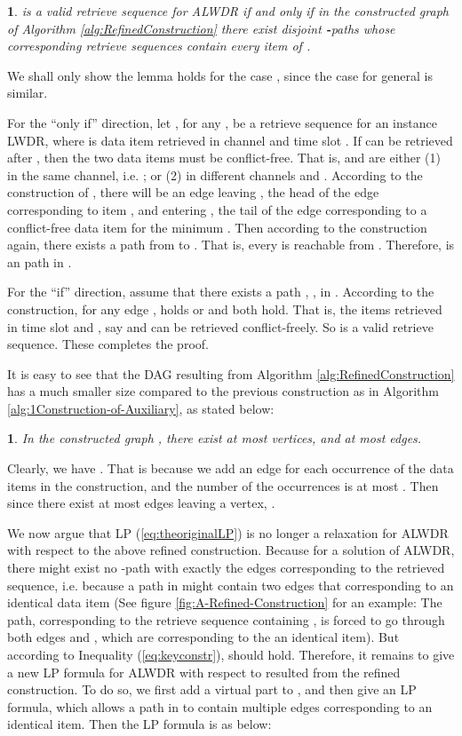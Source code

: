 \documentclass[11pt,english,onecolumn,draftcls]{IEEEtran}
\theoremstyle{plain}
\theoremstyle{plain}
\theoremstyle{plain}
\newtheorem{lem}[thm]{\protect\lemmaname}
\theoremstyle{plain}
\providecommand{\lemmaname}{Lemma}
\begin{document}
\begin{lem}
\label{lem:refinedconst} is a valid retrieve sequence for ALWDR
if and only if in the constructed graph of Algorithm \ref{alg:RefinedConstruction}
there exist  disjoint \textbf{-}paths whose corresponding
retrieve sequences contain every item of .  \end{lem}
\begin{IEEEproof}
We shall only show the lemma holds for the case , since
the case for general  is similar.

For the ``only if'' direction, let ,
 for any , be a retrieve sequence for an instance
LWDR, where  is data item  retrieved
in channel  and time slot . If 
can be retrieved after , then the two data
items must be conflict-free. That is, 
and  are either (1) in the same channel, i.e.
; or (2) in different channels and .
According to the construction of , there will be an edge leaving
, the head of the edge corresponding to item
, and entering ,
the tail of the edge corresponding to a conflict-free data item 
for the minimum . Then according to the construction again,
there exists a path from  to .
That is, every  is reachable from .
Therefore, 
is an  path in .

For the ``if'' direction, assume that there exists a path 
,
, in . According to the construction, for any
edge , 
holds or  and  both hold. That is,
the items retrieved in time slot  and , say 
and  can be retrieved conflict-freely.
So  is a valid
retrieve sequence. These completes the proof.
\end{IEEEproof}
It is easy to see that the DAG  resulting from Algorithm \ref{alg:RefinedConstruction}
has a much smaller size compared to the previous construction as in
Algorithm \ref{alg:1Construction-of-Auxiliary}, as stated below:
\begin{lem}
\label{lem:sizeofrefined}In the constructed graph , there exist
at most  vertices, and at most  edges.\end{lem}
\begin{IEEEproof}
Clearly, we have . That is because we
add an edge for each occurrence of the data items in the construction,
and the number of the occurrences is at most . Then
since there exist at most  edges leaving a vertex, .
\end{IEEEproof}
We now argue that LP (\ref{eq:theoriginalLP}) is no longer a relaxation
for ALWDR with respect to the above refined construction.
Because for a solution of ALWDR, there might exist
no -path with exactly the edges corresponding to the retrieved
sequence, i.e. because a path in  might contain two edges that
corresponding to an identical data item (See figure \ref{fig:A-Refined-Construction}
for an example: The path, corresponding to the retrieve sequence containing
, is forced to go through both edges 
and , which are corresponding to the an identical
item). But according to Inequality (\ref{eq:keyconstr}), 
should hold. Therefore, it remains to give a new LP formula for ALWDR
with respect to  resulted from the refined construction. To do
so, we first add a virtual part to , and then give an LP formula,
which allows a path in  to contain multiple edges corresponding
to an identical item. Then the LP formula is as below:
\end{document}
